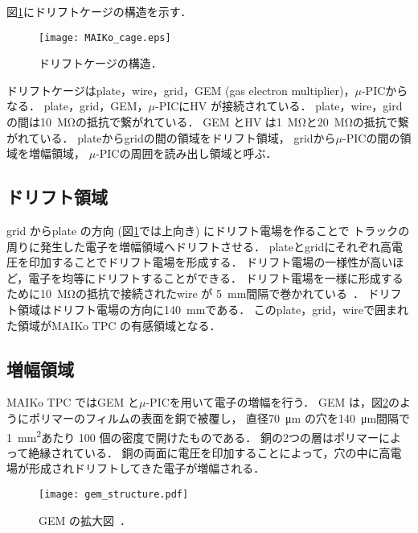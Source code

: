 \documentclass[../master]{subfiles}
\begin{document}
図\ref{fig::MAIKo_cage}にドリフトケージの構造を示す．
\begin{figure}
  \centering
  \texttt{[image: MAIKo\_cage.eps]}
  \caption{ドリフトケージの構造．}
  \label{fig::MAIKo_cage}
\end{figure}
ドリフトケージはplate，wire，grid，GEM (gas electron multiplier)，$\mu$-PICからなる．
plate，grid，GEM，$\mu$-PICにHV が接続されている．
plate，wire，girdの間は\SI{10}{\mega\ohm}の抵抗で繋がれている．
GEM とHV は\SI{1}{\mega\ohm}と\SI{20}{\mega\ohm}の抵抗で繋がれている．
plateからgridの間の領域をドリフト領域，
gridから$\mu$-PICの間の領域を増幅領域，
$\mu$-PICの周囲を読み出し領域と呼ぶ．


\subsection{ドリフト領域}
grid からplate の方向 (図\ref{fig::MAIKo_cage}では上向き) にドリフト電場を作ることで
トラックの周りに発生した電子を増幅領域へドリフトさせる．
plateとgridにそれぞれ高電圧を印加することでドリフト電場を形成する．
ドリフト電場の一様性が高いほど，電子を均等にドリフトすることができる．
ドリフト電場を一様に形成するために\SI{10}{\mega\ohm}の抵抗で接続されたwire が
\SI{5}{\milli\metre}間隔で巻かれている~\cite{furuno}．
ドリフト領域はドリフト電場の方向に\SI{140}{\milli\metre}である．
このplate，grid，wireで囲まれた領域がMAIKo TPC の有感領域となる．

\subsection{増幅領域}
MAIKo TPC ではGEM と$\mu$-PICを用いて電子の増幅を行う．
GEM は，図\ref{pic::GEM}のようにポリマーのフィルムの表面を銅で被覆し，
直径\SI{70}{\micro\metre} の穴を\SI{140}{\micro\metre}間隔で\SI{1}{\square\milli\metre}あたり
100 個の密度で開けたものである．
銅の2つの層はポリマーによって絶縁されている．
銅の両面に電圧を印加することによって，穴の中に高電場が形成されドリフトしてきた電子が増幅される．
\begin{figure}
  \centering
  \texttt{[image: gem\_structure.pdf]}
  \caption{GEM の拡大図~\cite{gem_compass}．}
  \label{pic::GEM}  
\end{figure}
\end{document}
